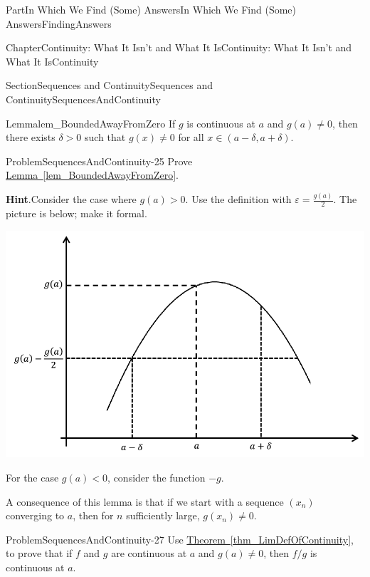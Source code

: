 \documentclass[oneside,10pt,]{book}
\newcommand{\blocktitlefont}{\relax}
\newcommand{\xreffont}{\relax}
\numberwithin{equation}{part}
\newcommand{\eps}{\varepsilon}
\newcommand{\lt}{<}
\begin{document}
\begin{partptx}{Part}{In Which We Find (Some) Answers}{}{In Which We Find (Some) Answers}{}{}{FindingAnswers}
\begin{chapterptx}{Chapter}{Continuity: What It Isn't and What It Is}{}{Continuity: What It Isn't and What It Is}{}{}{Continuity}
\begin{sectionptx}{Section}{Sequences and Continuity}{}{Sequences and Continuity}{}{}{SequencesAndContinuity}
\begin{lemma}{Lemma}{}{}{lem_BoundedAwayFromZero}%
If \(g\) is continuous at \(a\) and \(g(a)\neq 0\), then there exists \(\delta>0\) such that \(g(x)\neq
0\) for all \(x\in(a-\delta,a+\delta)\).%
\end{lemma}
\begin{problem}{Problem}{}{SequencesAndContinuity-25}%
Prove \hyperref[lem_BoundedAwayFromZero]{Lemma~{\xreffont\ref{lem_BoundedAwayFromZero}}}.%
\par\smallskip%
\noindent\textbf{\blocktitlefont Hint}.\hypertarget{SequencesAndContinuity-25-3}{}\quad{}Consider the case where \(g(a)>0\).  Use the definition with \(\eps=\frac{g(a)}{2}\).  The picture is below; make it formal.%
\begin{image}{0.125}{0.75}{0.125}{}%
\includegraphics[width=\linewidth]{external/images/Ch5fig8.png}
\end{image}%
For the case \(g(a)\lt 0\), consider the function \(-g\).%
\end{problem}
A consequence of this lemma is that if we start with a sequence \(\left(x_n\right)\) converging to \(a\), then for \(n\) sufficiently large, \(g(x_n)\neq 0\).%
\begin{problem}{Problem}{}{SequencesAndContinuity-27}%
Use \hyperref[thm_LimDefOfContinuity]{Theorem~{\xreffont\ref{thm_LimDefOfContinuity}}}, to prove that if \(f\) and \(g\) are continuous at \(a\) and \(g(a)\neq 0\), then \(f/g\) is continuous at \(a\).%
\end{problem}
\end{sectionptx}
\end{chapterptx}
\end{partptx}
\end{document}
